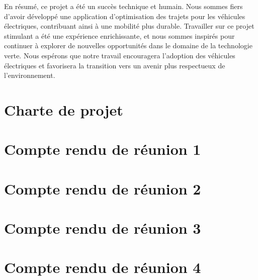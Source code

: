 \documentclass[a4paper, 12pt]{report}
\begin{document}
En résumé, ce projet a été un succès technique et humain. Nous sommes fiers d'avoir développé une application d'optimisation des trajets pour les véhicules électriques, contribuant ainsi à une mobilité plus durable. Travailler sur ce projet stimulant a été une expérience enrichissante, et nous sommes inspirés pour continuer à explorer de nouvelles opportunités dans le domaine de la technologie verte. Nous espérons que notre travail encouragera l'adoption des véhicules électriques et favorisera la transition vers un avenir plus respectueux de l'environnement.

\appendix
\chapter{Charte de projet}
    \label{chap:AnnexeA}
    
\chapter{Compte rendu de réunion 1}
    
\chapter{Compte rendu de réunion 2}
    
\chapter{Compte rendu de réunion 3}
    
\chapter{Compte rendu de réunion 4}
    
\end{document}
